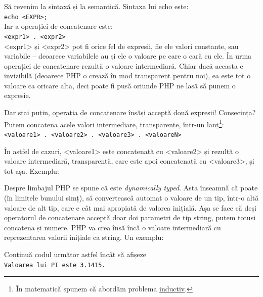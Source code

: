 Să revenim la sintaxă și la semantică. Sintaxa lui echo este:\\
\texttt{echo <EXPR>;}\\
Iar a operației de concatenare este:\\
\texttt{<expr1> . <expr2>}\\
<expr1> și <expr2> pot fi orice fel de expresii, fie ele valori constante,
sau variabile -- deoarece variabilele au și ele o valoare pe care
o cară cu ele. În urma operației de concatenare rezultă o valoare
intermediară. Chiar dacă aceasta e {\glqq}invizibilă{\grqq} (deoarece
PHP o crează în mod transparent pentru noi), ea este tot o valoare ca oricare
alta, deci poate fi pusă oriunde PHP ne lasă să punem o expresie.

Dar stai puțin, operația de concatenare însăși acceptă două expresii!
Consecința? Putem concatena acele valori intermediare, transparente,
într-un lanț\footnote{În matematică spunem că abordăm problema
\href{http://en.wikipedia.org/wiki/Structural_induction}{inductiv}.}:\\
\texttt{<valoare1> . <valoare2> . <valoare3> . <valoareN>}

În astfel de cazuri, <valoare1> este concatenată cu <valoare2> și rezultă
o valoare intermediară, transparentă, care este apoi concatenată cu <valoare3>,
și tot așa.
Exemplu:


Despre limbajul PHP se spune că este \textsl{dynamically typed}. Asta înseamnă
că poate (în limitele {\glqq}bunului simț{\grqq}), să convertească automat
o valoare de un tip, într-o altă valoare de alt tip, care e cât
mai apropiată de valorea inițială. Așa se face că deși operatorul
de concatenare acceptă doar doi parametri de tip string, putem totuși
concatena și numere. PHP va crea însă încă o valoare intermediară
cu reprezentarea valorii inițiale ca string. Un exemplu:



\begin{Exercise}[title={Primul cod propriu}]
Continuă codul următor astfel încât să afișeze\\
\texttt{Valoarea lui PI este 3.1415.}

\end{Exercise}

